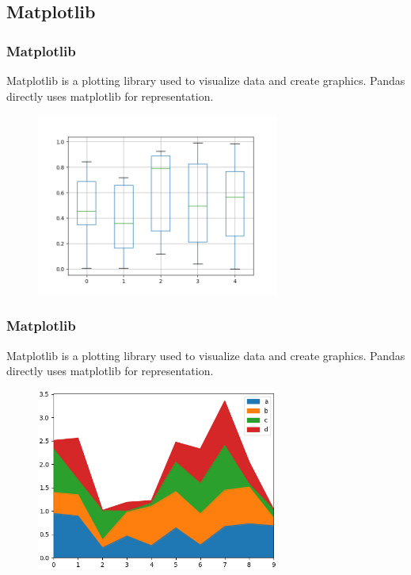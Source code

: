 \documentclass{beamer}
\begin{document}
\subsection{Matplotlib}
\begin{frame}
  \frametitle{Matplotlib}
  Matplotlib is a plotting library used to visualize data and create graphics.
  Pandas directly uses matplotlib for representation.
  \begin{figure}[h]
    \includegraphics[width=8cm]{img/matplotlib_1.png}
  \end{figure}
\end{frame}

\begin{frame}
  \frametitle{Matplotlib}
  Matplotlib is a plotting library used to visualize data and create graphics.
  Pandas directly uses matplotlib for representation.
  \begin{figure}[h]
    \includegraphics[width=8cm]{img/matplotlib_2.png}
  \end{figure}
\end{frame}


\end{document}
